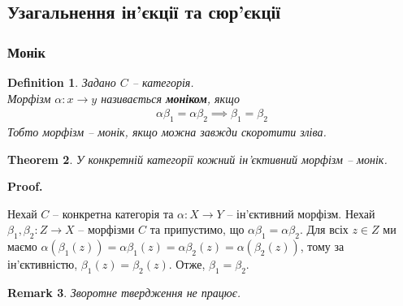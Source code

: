 \documentclass[a4paper, 10pt]{article}
\makeatletter
\theoremstyle{theoremdd}
\newtheorem{theorem}{Theorem}[subsection]
\newtheorem{definition}[theorem]{Definition}
\newtheorem{remark}[theorem]{Remark}
\renewenvironment{proof}[1][Proof.\\]{\par
\pushQED{\hfill \qed}%
\normalfont \topsep6\p@\@plus6\p@\relax
\trivlist
\item\relax
{\bfseries
#1\@addpunct{.}}\hspace\labelsep\ignorespaces
}{%
\popQED\endtrivlist\@endpefalse
}
\makeatother
\begin{document}
\subsection{Узагальнення ін'єкції та сюр'єкції}
\subsubsection{Монік}
\begin{definition}
Задано $C$ -- категорія.\\
Морфізм $\alpha \colon x \to y$ називається \textbf{моніком}, якщо
\begin{align*}
\alpha \beta_1 = \alpha \beta_2 \implies \beta_1 = \beta_2
\end{align*}
Тобто морфізм -- монік, якщо можна завжди скоротити зліва.
\begin{figure}[H]
\centering
{}
\end{figure}
\end{definition}

\begin{theorem}
У конкретній категорії кожний ін'єктивний морфізм -- монік.
\end{theorem}

\begin{proof}
Нехай $C$ -- конкретна категорія та $\alpha \colon X \to Y$ -- ін'єктивний морфізм. Нехай $\beta_1, \beta_2 \colon Z \to X$ -- морфізми $C$ та припустимо, що $\alpha \beta_1 = \alpha \beta_2$. Для всіх $z \in Z$ ми маємо $\alpha(\beta_1(z)) = \alpha \beta_1 (z) = \alpha \beta_2(z) = \alpha(\beta_2(z))$, тому за ін'єктивністю, $\beta_1(z) = \beta_2(z)$. Отже, $\beta_1 = \beta_2$.
\end{proof}

\begin{remark}
Зворотне твердження не працює.
\end{remark}
\end{document}
